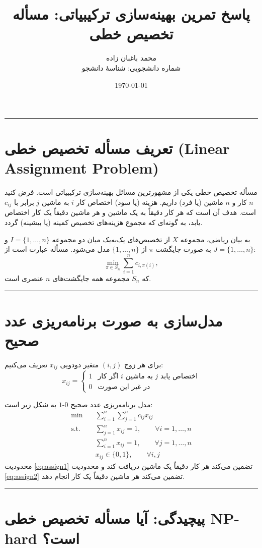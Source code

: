 \documentclass[11pt,a4paper]{article}
\title{پاسخ تمرین بهینه‌سازی ترکیبیاتی: مسأله تخصیص خطی}
\author{محمد باغبان زاده \\ شماره دانشجویی: شناسهٔ دانشجو}
\date{\today}
\newcommand{\en}[1]{\textenglish{#1}}
\newcommand{\separator}{\vspace{1em}\noindent\rule{\linewidth}{0.4pt}\vspace{1em}}
\newcommand{\thickseparator}{\vspace{1em}\noindent\rule{\linewidth}{1pt}\vspace{1em}}
\begin{document}
\maketitle
\thickseparator

\section{تعریف مسأله تخصیص خطی (\en{Linear Assignment Problem})}

مسأله تخصیص خطی یکی از مشهورترین مسائل بهینه‌سازی ترکیبیاتی است. فرض کنید $n$ کار و $n$ ماشین (یا فرد) داریم. هزینه (یا سود) اختصاص کار $i$ به ماشین $j$ برابر با $c_{ij}$ است. هدف آن است که هر کار دقیقاً به یک ماشین و هر ماشین دقیقاً یک کار اختصاص یابد، به گونه‌ای که مجموع هزینه‌های تخصیص کمینه (یا بیشینه) گردد.

به بیان ریاضی، مجموعه $X$ از تخصیص‌های یک‌به‌یک میان دو مجموعه $I=\{1,\dots,n\}$ و $J=\{1,\dots,n\}$ به صورت جایگشت $\pi$ از $\{1,\dots,n\}$ مدل می‌شود. مسأله عبارت است از:
\[
\min_{\pi \in S_n} \sum_{i=1}^{n} c_{i,\pi(i)},
\]
که $S_n$ مجموعه همه جایگشت‌های $n$ عنصری است.

\separator
\newpage
\section{مدل‌سازی به صورت برنامه‌ریزی عدد صحیح}

برای هر زوج $(i,j)$ متغیر دودویی $x_{ij}$ تعریف می‌کنیم:
\[
x_{ij} = \begin{cases}
1 & \text{اگر کار $i$ به ماشین $j$ اختصاص یابد}\\
0 & \text{در غیر این صورت}
\end{cases}
\]

مدل برنامه‌ریزی عدد صحیح $0$-$1$ به شکل زیر است:
\begin{align}
\min \quad & \sum_{i=1}^{n}\sum_{j=1}^{n} c_{ij} x_{ij} \label{eq:obj}\\
\text{s.t.} \quad & \sum_{j=1}^{n} x_{ij} = 1, \qquad \forall i=1,\dots,n \label{eq:assign1}\\
& \sum_{i=1}^{n} x_{ij} = 1, \qquad \forall j=1,\dots,n \label{eq:assign2}\\
& x_{ij} \in \{0,1\}, \qquad \forall i,j \label{eq:binary}
\end{align}
محدودیت \eqref{eq:assign1} تضمین می‌کند هر کار دقیقاً یک ماشین دریافت کند و محدودیت \eqref{eq:assign2} تضمین می‌کند هر ماشین دقیقاً یک کار انجام دهد.

\separator
\newpage
\section{پیچیدگی: آیا مسأله تخصیص خطی \en{NP-hard} است؟}
\end{document}

